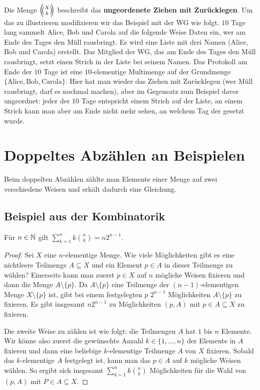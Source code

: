 \begin{bem}
		 Die Menge $\left(\!\!\binom{X}{k}\!\!\right)$ beschreibt das \textbf{ungeordenete Ziehen mit Zurücklegen}. Um das zu illustrieren modifizieren wir das Beispiel mit der WG wie folgt. $10$ Tage lang sammelt Alice, Bob und Carola auf die folgende Weise Daten ein, wer am Ende des Tages den Müll rausbringt. Es wird eine Liste mit drei Namen (Alice, Bob und Carola) erstellt. Das Mitglied der WG, das am Ende des Tages den Müll rausbringt, setzt einen Strich in der Liste bei seinem Namen. Das Protokoll am Ende der $10$ Tage ist eine $10$-elementige Multimenge auf der Grundmenge $\{ \text{Alice}, \text{Bob}, \text{Carola}\}$.  Hier hat man wieder das Ziehen mit Zurücklegen (wer Müll rausbringt, darf es nochmal machen), aber im Gegensatz zum Beispiel davor ungeordnet: jeder der $10$ Tage entspricht einem Strich auf der Liste, an einem Strich kann man aber am Ende nicht mehr sehen, an welchem Tag der gesetzt wurde. 
\end{bem} 

\section{Doppeltes Abzählen an Beispielen} 

\begin{bem}
	Beim doppelten Abzählen zählte man Elemente einer Menge auf zwei verschiedene Weisen und erhält dadurch eine Gleichung. 
\end{bem} 

\subsection{Beispiel aus der Kombinatorik}

\begin{prop} \label{doppeltes:abzaehlen} 
	Für $n \in \mathbb{N}$ gilt $\sum_{k=1}^n k \binom{n}{k} = n 2^{n-1}.$ 
\end{prop} 
\begin{proof}
	Sei $X$ eine $n$-elementige Menge. Wie viele Möglichkeiten gibt es eine nichtleere Teilmenge $A \subseteq X$ und ein Element $p \in A$ in dieser Teilmenge zu wählen? Einerseits kann man zuerst $p \in X$ auf $n$ mögliche Weisen fixieren und dann die Menge $A \setminus \{p\}$. Da $A \setminus \{p\}$ eine Teilmenge der $(n-1)$-elementigen Menge $X \setminus \{p\}$ ist, gibt bei einem festgelegten $p$ $2^{n-1}$ Möglichkeiten $A \setminus \{p\}$ zu fixieren. Es gibt insgesamt $n 2^{n-1}$ zu Möglichkeiten $(p,A)$ mit $p \in A \subseteq X$ zu fixieren. 
	
	Die zweite Weise zu zählen ist wie folgt: die Teilmengen $A$ hat $1$ bis $n$ Elemente. Wir könne also zuerst die gewünschte Anzahl $k \in \{1,\ldots,n\}$ der Elemente in $A$ fixieren und dann eine beliebige $k$-elementige Teilmenge $A$ von $X$ fixieren. Sobald das $k$-elementige $A$ festgelegt ist, kann man das $p \in A$ auf $k$ mögliche Weisen wählen. So ergibt sich insgesamt $\sum_{k=1}^n k \binom{n}{k}$ Möglichkeiten für die Wahl von $(p, A)$ mit $P \in A \subseteq X$. 
\end{proof} 

